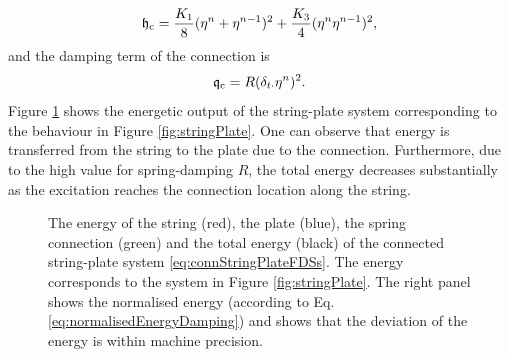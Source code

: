 \begin{equation*}
    \mathfrak{h}_{\text{c}} = \frac{K_1}{8}(\eta^n+\eta^{n-1})^2 + \frac{K_3}{4}(\eta^n\eta^{n-1})^2,
\end{equation*}
and the damping term of the connection is
\begin{equation*}
    \mathfrak{q}_{\text{c}} = R(\delta_{t\cdot}\eta^n)^2.
\end{equation*}
Figure \ref{fig:energyStringPlate} shows the energetic output of the string-plate system corresponding to the behaviour in Figure \ref{fig:stringPlate}. One can observe that energy is transferred from the string to the plate due to the connection. Furthermore, due to the high value for spring-damping $R$, the total energy decreases substantially as the excitation reaches the connection location along the string. 

\begin{figure}[h]
    \centering
      \caption{The energy of the string (red), the plate (blue), the spring connection (green) and the total energy (black) of the connected string-plate system \eqref{eq:connStringPlateFDSs}. The energy corresponds to the system in Figure \ref{fig:stringPlate}. The right panel shows the normalised energy (according to Eq. \eqref{eq:normalisedEnergyDamping}) and shows that the deviation of the energy is within machine precision. \label{fig:energyStringPlate}}
\end{figure}

